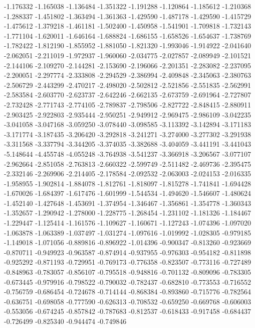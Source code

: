 -1.176332
-1.165038
-1.136484
-1.351322
-1.191288
-1.120864
-1.185612
-1.210368
-1.288337
-1.451802
-1.363494
-1.361363
-1.429590
-1.487178
-1.429590
-1.415729
-1.475612
-1.379218
-1.461181
-1.502400
-1.450958
-1.541901
-1.709818
-1.732143
-1.771104
-1.620011
-1.646164
-1.688824
-1.686155
-1.658526
-1.654637
-1.738769
-1.782422
-1.812190
-1.855952
-1.881050
-1.821320
-1.993046
-1.914922
-2.041640
-2.062051
-2.211019
-1.972937
-1.960060
-2.034775
-2.027857
-2.089949
-2.101521
-2.144106
-2.109270
-2.144281
-2.153690
-2.196066
-2.201351
-2.283082
-2.237095
-2.200051
-2.297774
-2.333808
-2.294529
-2.386994
-2.409848
-2.345063
-2.380763
-2.506729
-2.443299
-2.470217
-2.498020
-2.502812
-2.521856
-2.551835
-2.562991
-2.583584
-2.603770
-2.623737
-2.642246
-2.662135
-2.673759
-2.691964
-2.727807
-2.732428
-2.771743
-2.774105
-2.789837
-2.798506
-2.827722
-2.848415
-2.880911
-2.903425
-2.922803
-2.935444
-2.950251
-2.949912
-2.969475
-2.986109
-3.042235
-3.041058
-3.047168
-3.059250
-3.078440
-3.098585
-3.113392
-3.142894
-3.171183
-3.171774
-3.187435
-3.206420
-3.292818
-3.241271
-3.274000
-3.277302
-3.291938
-3.311568
-3.337794
-3.344205
-3.374035
-3.382688
-3.404059
-3.441191
-3.441043
-5.148644
-4.455748
-4.055248
-3.764938
-3.541237
-3.366918
-3.206567
-3.077107
-2.962664
-2.851058
-2.763813
-2.660322
-2.599749
-2.511482
-2.469736
-2.395475
-2.332146
-2.269906
-2.214405
-2.178584
-2.092532
-2.063003
-2.024153
-2.016335
-1.958955
-1.902814
-1.884078
-1.812761
-1.818097
-1.815278
-1.741841
-1.694428
-1.670026
-1.684397
-1.617476
-1.601999
-1.544534
-1.494620
-1.546607
-1.480624
-1.452140
-1.427648
-1.453691
-1.374954
-1.346467
-1.356861
-1.354778
-1.360343
-1.352657
-1.290942
-1.278000
-1.228775
-1.268454
-1.231102
-1.181326
-1.184467
-1.229447
-1.125414
-1.161576
-1.109627
-1.160671
-1.127243
-1.074396
-1.097020
-1.063878
-1.063389
-1.037497
-1.031274
-1.097616
-1.019992
-1.028305
-0.979185
-1.149018
-1.071056
-0.889816
-0.896922
-1.014396
-0.900347
-0.813260
-0.923669
-0.870711
-0.949923
-0.963587
-0.874914
-0.937955
-0.976303
-0.954182
-0.811898
-0.925292
-0.871193
-0.729951
-0.769173
-0.776358
-0.823507
-0.773116
-0.727489
-0.848963
-0.783057
-0.856107
-0.795518
-0.948816
-0.701132
-0.809096
-0.783305
-0.673445
-0.979916
-0.798522
-0.790032
-0.782437
-0.682810
-0.773553
-0.716552
-0.756759
-0.686454
-0.724678
-0.714144
-0.868384
-0.893860
-0.715776
-0.782564
-0.636751
-0.698058
-0.777590
-0.626313
-0.708532
-0.659250
-0.669768
-0.606003
-0.553056
-0.674245
-0.857842
-0.787683
-0.812537
-0.618433
-0.917458
-0.684437
-0.726499
-0.825340
-0.944474
-0.749846
